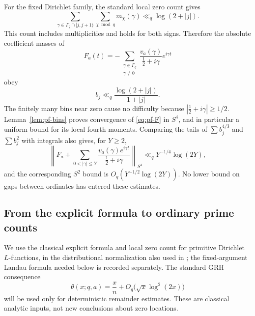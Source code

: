 For the fixed Dirichlet family, the standard local zero count gives
\begin{equation}
\label{eq:pf-localcount}
 \sum_{\gamma\in\Gamma_q\cap[j,j+1)}\sum_{\chi\bmod q}m_\chi(\gamma)
                 \ll_q\log(2+|j|).
\end{equation}
This count includes multiplicities and holds for both signs.  Therefore
the absolute coefficient masses of
\begin{equation}
\label{eq:pf-F}
 F_a(t)=-\sum_{\substack{\gamma\in\Gamma_q\\\gamma\ne0}}
                  \frac{v_a(\gamma)}{\tfrac12+i\gamma}e^{i\gamma t}
\end{equation}
obey
\begin{equation}
\label{eq:pf-bdecay}
 b_j\ll_q\frac{\log(2+|j|)}{1+|j|}.
\end{equation}
The finitely many bins near zero cause no difficulty because
$|\tfrac12+i\gamma|\geq1/2$.
Lemma~\ref{lem:pf-bins} proves convergence of \eqref{eq:pf-F} in $S^4$,
and in particular a uniform bound for its local fourth moments.  Comparing
the tails of $\sum b_j^{4/3}$ and $\sum b_j^2$ with integrals also gives,
for $Y\geq2$,
\begin{equation}
\label{eq:pf-truncation}
 \left\|F_a+
   \sum_{0<|\gamma|\leq Y}
       \frac{v_a(\gamma)e^{i\gamma t}}{\tfrac12+i\gamma}\right\|_{S^4}
       \ll_q Y^{-1/4}\log(2Y),
\end{equation}
and the corresponding $S^2$ bound is
$O_q(Y^{-1/2}\log(2Y))$.  No lower bound on gaps between ordinates has
entered these estimates.

\subsection{From the explicit formula to ordinary prime counts}
\label{subsec:pf-transfer}

We use the classical explicit formula and local zero count for primitive
Dirichlet $L$-functions, in the distributional normalization also used in
\cite{KaczorowskiRamare2003}; the fixed-argument Landau formula needed
below is recorded separately.  The standard GRH consequence
\begin{equation}
\label{eq:pf-pointwise}
 \theta(x;q,a)=\frac{x}{n}+O_q\bigl(\sqrt{x}\log^2(2x)\bigr)
\end{equation}
will be used only for deterministic remainder estimates.  These are
classical analytic inputs, not new conclusions about zero locations.

